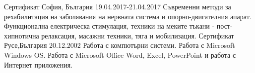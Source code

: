 \cventry
{Сертификат}
{София, България 19.04.2017-21.04.2017}
{
Съвременни методи за рехабилитация на заболявания на нервната система и опорно-двигателния апарат. Функционална електрическа стимулация, техники на меките тъкани - пост-хипнотична релаксация, масажни техники, тяга и мобилизация.
}
\vspace{+3mm}
\cventry
{Сертификат}
{Русе,България 20.12.2002}
{
Работа с компютърни системи. Работа с Microsoft Windows OS. Работа с Microsoft Office Word, Excel, PowerPoint и работа с Интернет приложения.
}

